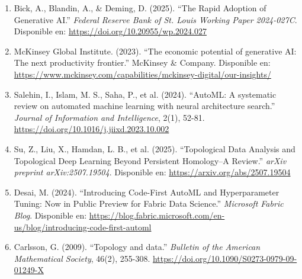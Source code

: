 \documentclass[11pt]{article}
\begin{document}
\begin{enumerate}
	\item Bick, A., Blandin, A., \& Deming, D. (2025). ``The Rapid Adoption of Generative AI.'' \textit{Federal Reserve Bank of St. Louis Working Paper 2024-027C}. Disponible en: \url{https://doi.org/10.20955/wp.2024.027}

	\item McKinsey Global Institute. (2023). ``The economic potential of generative AI: The next productivity frontier.'' McKinsey \& Company. Disponible en: \url{https://www.mckinsey.com/capabilities/mckinsey-digital/our-insights/}

	\item Salehin, I., Islam, M. S., Saha, P., et al. (2024). ``AutoML: A systematic review on automated machine learning with neural architecture search.'' \textit{Journal of Information and Intelligence}, 2(1), 52-81. \url{https://doi.org/10.1016/j.jiixd.2023.10.002}

	\item Su, Z., Liu, X., Hamdan, L. B., et al. (2025). ``Topological Data Analysis and Topological Deep Learning Beyond Persistent Homology--A Review.'' \textit{arXiv preprint arXiv:2507.19504}. Disponible en: \url{https://arxiv.org/abs/2507.19504}

	\item Desai, M. (2024). ``Introducing Code-First AutoML and Hyperparameter Tuning: Now in Public Preview for Fabric Data Science.'' \textit{Microsoft Fabric Blog}. Disponible en: \url{https://blog.fabric.microsoft.com/en-us/blog/introducing-code-first-automl}

	\item Carlsson, G. (2009). ``Topology and data.'' \textit{Bulletin of the American Mathematical Society}, 46(2), 255-308. \url{https://doi.org/10.1090/S0273-0979-09-01249-X}
\end{enumerate}
\end{document}
